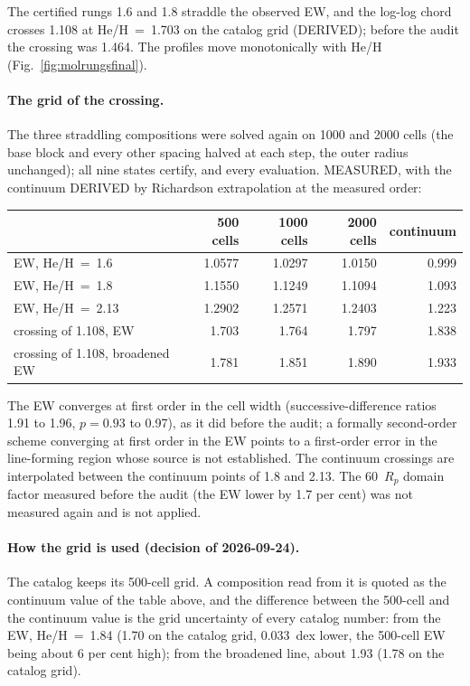 \documentclass[11pt]{my_memo}
\begin{document}
\noindent
The certified rungs 1.6 and 1.8 straddle the observed EW, and the log-log
chord crosses 1.108 at He/H~=~1.703 on the catalog grid (DERIVED); before the
audit the crossing was 1.464. The profiles move monotonically with He/H
(Fig.~\ref{fig:molrungsfinal}).

\paragraph{The grid of the crossing.} The three straddling compositions
were solved again on 1000 and 2000 cells (the base block and every other
spacing halved at each step, the outer radius unchanged); all nine states
certify, and every evaluation. MEASURED, with the continuum DERIVED by
Richardson extrapolation at the measured order:

\begin{center}
\footnotesize
\begin{tabular}{@{}l r r r r@{}}
\toprule
 & 500 cells & 1000 cells & 2000 cells & continuum\\
\midrule
EW, He/H~=~1.6 & 1.0577 & 1.0297 & 1.0150 & 0.999\\
EW, He/H~=~1.8 & 1.1550 & 1.1249 & 1.1094 & 1.093\\
EW, He/H~=~2.13 & 1.2902 & 1.2571 & 1.2403 & 1.223\\
crossing of 1.108, EW & 1.703 & 1.764 & 1.797 & 1.838\\
crossing of 1.108, broadened EW & 1.781 & 1.851 & 1.890 & 1.933\\
\bottomrule
\end{tabular}
\end{center}

\noindent
The EW converges at first order in the cell width (successive-difference
ratios 1.91 to 1.96, $p = 0.93$ to 0.97), as it did before the audit; a
formally second-order scheme converging at first order in the EW points to
a first-order error in the line-forming region whose source is not
established. The continuum crossings are interpolated between the continuum
points of 1.8 and 2.13. The 60~$R_p$ domain factor measured before the audit
(the EW lower by 1.7 per cent) was not measured again and is not applied.

\paragraph{How the grid is used (decision of 2026-09-24).} The catalog keeps
its 500-cell grid. A composition read from it is quoted as the continuum
value of the table above, and the difference between the 500-cell and the
continuum value is the grid uncertainty of every catalog number: from the
EW, He/H~=~1.84 (1.70 on the catalog grid, 0.033~dex lower, the 500-cell EW
being about 6 per cent high); from the broadened line, about 1.93 (1.78 on
the catalog grid).
\end{document}
